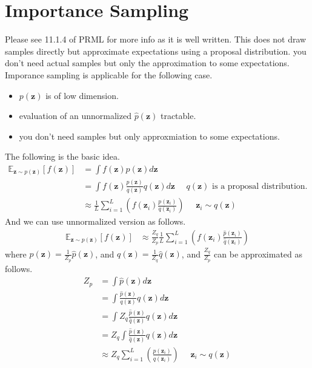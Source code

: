 \documentclass[a4]{article}
\begin{document}
\section{Importance Sampling}
Please see 11.1.4 of PRML \cite{bishop2007} for more info as it is well written.
This does not draw samples directly but approximate expectations using a proposal distribution.
you don't need actual samples but only the approximation to some expectations.
Imporance sampling is applicable for the following case.
\begin{itemize}
\item $p(\bm{z})$ is of low dimension.
\item evaluation of an unnormalized $\hat{p}(\bm{z})$ tractable.
\item you don't need samples but only approxmiation to some expectations.
\end{itemize}
The following is the basic idea.
\begin{equation}
\begin{aligned}
\mathbb{E}_{\bm{z}\sim p(\bm{z})}\left[f(\bm{z})\right] &= \int f(\bm{z})p(\bm{z})d\bm{z}\\
&= \int f(\bm{z})\frac{p(\bm{z})}{q(\bm{z})}q(\bm{z})d\bm{z}
\:\:\:\:\:\:q(\bm{z}) \text{ is a proposal distribution.}\\
&\approx \frac{1}{L}\sum_{i=1}^L \left(f(\bm{z}_i)\frac{p(\bm{z}_i)}{q(\bm{z}_i)}\right)
\:\:\:\:\:\:\bm{z}_i \sim q(\bm{z})
\end{aligned}
\end{equation}
And we can use unnormalized version as follows.
\begin{equation}
\begin{aligned}
\mathbb{E}_{\bm{z}\sim p(\bm{z})}\left[f(\bm{z})\right]
&\approx \frac{Z_q}{Z_p}\frac{1}{L}
    \sum_{i=1}^L \left(f(\bm{z}_i)\frac{\hat{p}(\bm{z}_i)}{\hat{q}(\bm{z}_i)}\right)
\end{aligned}
\end{equation}
where $p(\bm{z})=\frac{1}{Z_p}\hat{p}(\bm{z})$, and $q(\bm{z})=\frac{1}{Z_q}\hat{q}(\bm{z})$, and
$\frac{Z_q}{Z_p}$ can be approximated as follows.
\begin{equation}
\begin{aligned}
Z_p &= \int \hat{p}(\bm{z})d\bm{z}\\
    &= \int \frac{\hat{p}(\bm{z})}{q(\bm{z})}q(\bm{z})d\bm{z}\\
    &= \int Z_q \frac{\hat{p}(\bm{z})}{\hat{q}(\bm{z})}q(\bm{z})d\bm{z}\\
    &= Z_q \int\frac{\hat{p}(\bm{z})}{\hat{q}(\bm{z})}q(\bm{z})d\bm{z}\\
    &\approx Z_q \sum_{i=1}^L \left(\frac{\hat{p}(\bm{z}_i)}{\hat{q}(\bm{z}_i)}\right)
\:\:\:\:\:\:\bm{z}_i \sim q(\bm{z})\\
\end{aligned}
\end{equation}
\end{document}
